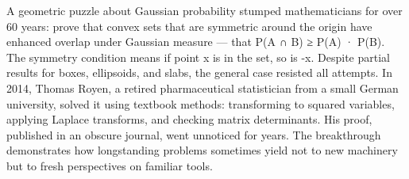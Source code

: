 A geometric puzzle about Gaussian probability stumped mathematicians for over 60 years: prove that convex sets that are symmetric around the origin have enhanced overlap under Gaussian measure — that P(A ∩ B) ≥ P(A) · P(B). The symmetry condition means if point x is in the set, so is -x. Despite partial results for boxes, ellipsoids, and slabs, the general case resisted all attempts. In 2014, Thomas Royen, a retired pharmaceutical statistician from a small German university, solved it using textbook methods: transforming to squared variables, applying Laplace transforms, and checking matrix determinants. His proof, published in an obscure journal, went unnoticed for years. The breakthrough demonstrates how longstanding problems sometimes yield not to new machinery but to fresh perspectives on familiar tools.
